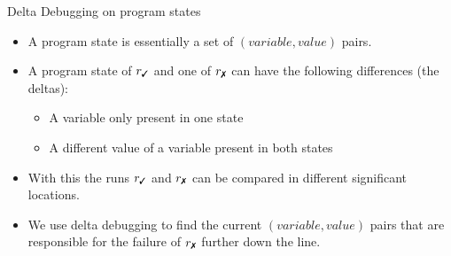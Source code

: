 \begin{frame}{Delta Debugging on program states}
	\begin{itemize}
		\item A program state is essentially a set of $(variable, value)$ pairs.
		\item A program state of $r_\cmark$ and one of $r_\xmark$ can have the following differences (the deltas): \begin{itemize}
			\item A variable only present in one state
			\item A different value of a variable present in both states
		\end{itemize}
		\item With this the runs $r_\cmark$ and $r_\xmark$ can be compared in different significant locations. 
		\item We use delta debugging to find the current $(variable, value)$ pairs that are responsible for the failure of $r_\xmark$ further down the line.
	\end{itemize}


\end{frame}

\newcommand{\cecarrow}{\to}

